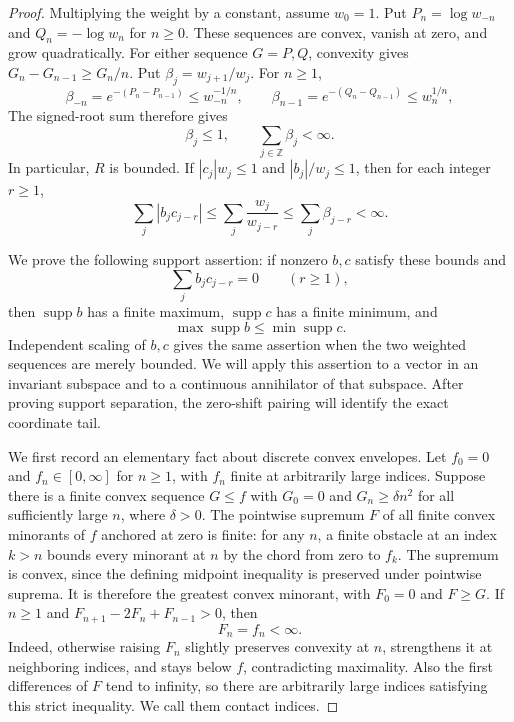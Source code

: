 \begin{proof}
Multiplying the weight by a constant, assume $w_0=1$. Put
$P_n=\log w_{-n}$ and $Q_n=-\log w_n$ for $n\geq0$.
These sequences are convex, vanish at zero, and grow quadratically.
For either sequence $G=P,Q$, convexity gives
$G_n-G_{n-1}\geq G_n/n$. Put $\beta_j=w_{j+1}/w_j$. For $n\geq1$,
\[
 \beta_{-n}=e^{-(P_n-P_{n-1})}\leq w_{-n}^{-1/n},\qquad
 \beta_{n-1}=e^{-(Q_n-Q_{n-1})}\leq w_n^{1/n},
\]
The signed-root sum therefore gives
\begin{equation}\label{eq:p3-ratio-sum}
 \beta_j\leq1,
 \qquad \sum_{j\in\mathbb Z}\beta_j<\infty.
\end{equation}
In particular, $R$ is bounded. If $|c_j|w_j\leq1$ and
$|b_j|/w_j\leq1$, then for each integer $r\geq1$,
\[
 \sum_j|b_jc_{j-r}|
 \leq\sum_j\frac{w_j}{w_{j-r}}
 \leq\sum_j\beta_{j-r}<\infty.
\]

We prove the following support assertion: if nonzero $b,c$ satisfy
these bounds and
\begin{equation}\label{eq:p3-correlations}
 \sum_jb_jc_{j-r}=0\qquad(r\geq1),
\end{equation}
then $\operatorname{supp}b$ has a finite maximum,
$\operatorname{supp}c$ has a finite minimum, and
\begin{equation}\label{eq:p3-support-separation}
 \max\operatorname{supp}b\leq\min\operatorname{supp}c.
\end{equation}
Independent scaling of $b,c$ gives the same assertion when the two
weighted sequences are merely bounded. We will apply this assertion to
a vector in an invariant subspace and to a continuous annihilator of
that subspace. After proving support separation, the zero-shift pairing
will identify the exact coordinate tail.

We first record an elementary fact about discrete convex envelopes.
Let $f_0=0$ and $f_n\in[0,\infty]$ for $n\geq1$, with $f_n$ finite
at arbitrarily large indices. Suppose there is a finite convex sequence
$G\leq f$ with $G_0=0$ and $G_n\geq\delta n^2$ for all sufficiently
large $n$, where $\delta>0$. The pointwise supremum $F$ of all finite
convex minorants of $f$ anchored at zero is finite: for any $n$, a finite
obstacle at an index $k>n$ bounds every minorant at $n$ by the chord
from zero to $f_k$.
The supremum is convex, since the defining midpoint inequality is
preserved under pointwise suprema. It is therefore the greatest convex
minorant, with $F_0=0$ and $F\geq G$.
If $n\geq1$ and $F_{n+1}-2F_n+F_{n-1}>0$, then
\begin{equation}\label{eq:p3-contact}
 F_n=f_n<\infty.
\end{equation}
Indeed, otherwise raising $F_n$ slightly preserves convexity at $n$,
strengthens it at neighboring indices, and stays below $f$, contradicting
maximality. Also the first differences of $F$ tend to infinity, so
there are arbitrarily large indices satisfying this strict inequality.
We call them contact indices.


\end{proof}
